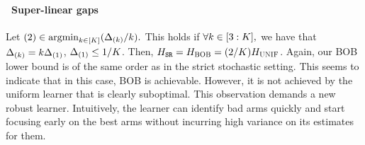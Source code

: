 \paragraph{\raisebox{.04cm}{\textcolor{bull}{$\blacktriangleright$}}~Super-linear gaps} Let $(2)\in\mathrm{argmin}_{k\in[K]} (\Delta_{(k)}/k).$ 
This holds if 
$\forall k\in[3:K],$ we have that $\Delta_{(k)}=k\Delta_{(1)}$, $\Delta_{(1)}\leq 1/K$. Then, 
$H_{{\normalfont \texttt{SR}}}=H_{{\normalfont \textsc{{BOB}}}}=(2/K) H_{{\normalfont \textsc{UNIF}}}$. 
Again, our BOB lower bound is of the same order as in 
the strict stochastic setting. This seems to indicate that in this case, BOB is achievable. However, it is not achieved by the uniform 
learner that is clearly suboptimal. This observation demands a new robust learner. Intuitively,  the learner can  
identify bad arms quickly
and  start focusing early on the best arms without incurring 
high variance on its estimates for them.
%
